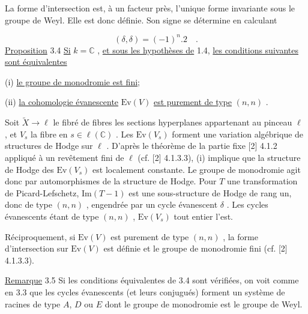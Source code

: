 La forme d'intersection est, à un facteur près, l'unique forme invariante sous le groupe de Weyl. Elle est donc définie. Son signe se détermine en calculant

\begin{equation*}
(\delta, \delta) = (-1)^n . 2 \quad .
\end{equation*}
\underline{Proposition} 3.4 \quad \underline{Si} $k = \mathbb{C}$ , \underline{et sous les hypothèses de} 1.4, \underline{les conditions suivantes sont équivalentes}

(i) \underline{le groupe de monodromie est fini};

(ii) \underline{la cohomologie évanescente} $\mathrm{Ev}(V)$ \underline{est purement de type} $(n, n)$ .

Soit $\widetilde{X} \longrightarrow \ell$ le fibré de fibres les sections hyperplanes appartenant au pinceau $\ell$ , et $V_s$ la fibre en $s \in \ell(\mathbb{C})$ . Les $\mathrm{Ev}(V_s)$ forment une variation algébrique de structures de Hodge sur $\ell$ . D'après le théorème de la partie fixe [2] 4.1.2 appliqué à un revêtement fini de $\ell$ (cf. [2] 4.1.3.3), (i) implique que la structure de Hodge des $\mathrm{Ev}(V_s)$ est localement constante. Le groupe de monodromie agit donc par automorphismes de la structure de Hodge. Pour $T$ une transformation de Picard-Lefschetz, $\mathrm{Im}(T-1)$ est une sous-structure de Hodge de rang un, donc de type $(n, n)$ , engendrée par un cycle évanescent $\delta$ . Les cycles évanescents étant de type $(n, n)$ , $\mathrm{Ev}(V_s)$ tout entier l'est.

Réciproquement, si $\mathrm{Ev}(V)$ est purement de type $(n, n)$ , la forme d'intersection sur $\mathrm{Ev}(V)$ est définie et le groupe de monodromie fini (cf. [2] 4.1.3.3).



\underline{Remarque} 3.5 \quad Si les conditions équivalentes de 3.4 sont vérifiées, on voit comme en 3.3 que les cycles évanescents (et leurs conjugués) forment un système de racines de type $A$, $D$ ou $E$ dont le groupe de monodromie est le groupe de Weyl.

